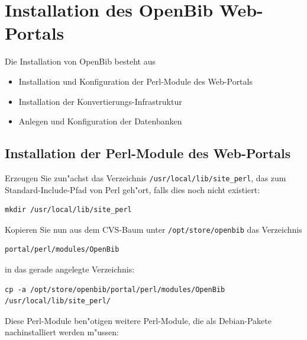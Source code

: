 \documentclass[11pt, twoside, a4paper, BCOR8mm, DIV12, bibtotoc,idxtotoc]{scrbook}
\begin{document}
\chapter{Installation des OpenBib Web-Portals}

Die Installation von OpenBib besteht aus

\begin{itemize}
\item Installation und Konfiguration der Perl-Module des Web-Portals
\item Installation der Konvertierungs-Infrastruktur
\item Anlegen und Konfiguration der Datenbanken
\end{itemize}

\section{Installation der Perl-Module des Web-Portals}

Erzeugen Sie zun"achst das Verzeichnis \texttt{/usr/local/lib/site\_perl}, das
zum Standard-Include-Pfad von Perl geh"ort, falls dies noch nicht
existiert:

\begin{verbatim}
mkdir /usr/local/lib/site_perl
\end{verbatim}

Kopieren Sie nun aus dem CVS-Baum unter \texttt{/opt/store/openbib}
das Verzeichnis 

\begin{verbatim}
portal/perl/modules/OpenBib
\end{verbatim}

in das gerade angelegte Verzeichnis:

\begin{verbatim}
cp -a /opt/store/openbib/portal/perl/modules/OpenBib /usr/local/lib/site_perl/
\end{verbatim}

Diese Perl-Module ben"otigen weitere Perl-Module, die als
Debian-Pakete nachinstalliert werden m"ussen:
\end{document}
